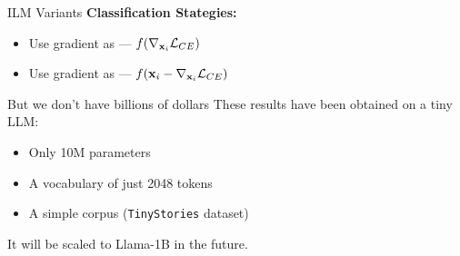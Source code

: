 \begin{frame}{ILM Variants}
    \pause
    \vspace{0.5cm}
    \textbf{Classification Stategies:}
    \pause
    \begin{itemize}
        \item Use gradient as  --- $f(\nabla_{\mathbf{x}_i}\mathcal{L}_{CE})$
        \pause
        \item Use gradient as  --- $f(\mathbf{x}_i - \nabla_{\mathbf{x}_i}\mathcal{L}_{CE})$
    \end{itemize}
\end{frame}




\begin{frame}{But we don't have billions of dollars}
    These results have been obtained on a tiny LLM:
    \begin{itemize}
        \item Only 10M parameters
        \item A vocabulary of just 2048 tokens
        \item A simple corpus (\texttt{TinyStories} dataset)
    \end{itemize}

    \vfill
    It will be scaled to Llama-1B in the future.
\end{frame}
